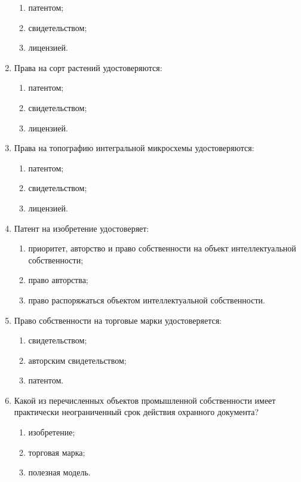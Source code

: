 \begin{enumerate}
\begin{enumerate}
        \item \cmark патентом;
        \item свидетельством;
        \item лицензией.
    \end{enumerate}
    \item Права на сорт растений удостоверяются:
    \begin{enumerate}
        \item \cmark патентом;
        \item свидетельством;
        \item лицензией.
    \end{enumerate}
    \item Права на топографию интегральной микросхемы удостоверяются:
    \begin{enumerate}
        \item патентом;
        \item \cmark свидетельством;
        \item лицензией.
    \end{enumerate}
    \item Патент на изобретение удостоверяет:
    \begin{enumerate}
        \item \cmark приоритет, авторство и право собственности на объект интеллектуальной собственности;
        \item право авторства;
        \item право распоряжаться объектом интеллектуальной собственности.
    \end{enumerate}
    \item Право собственности на торговые марки удостоверяется:
    \begin{enumerate}
        \item \cmark свидетельством;
        \item авторским свидетельством;
        \item патентом.
    \end{enumerate}
    \item Какой из перечисленных объектов промышленной собственности имеет практически неограниченный срок действия охранного документа?
    \begin{enumerate}
        \item изобретение;
        \item \cmark торговая марка;
        \item полезная модель.
    \end{enumerate}

\end{enumerate}

